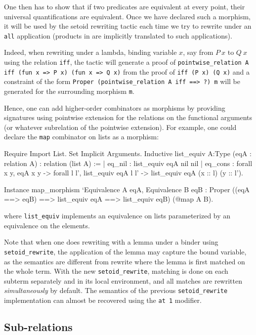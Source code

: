 One then has to show that if two predicates are equivalent at every
point, their universal quantifications are equivalent. Once we have
declared such a morphism, it will be used by the setoid rewriting tactic
each time we try to rewrite under an \texttt{all} application (products
in \Prop{} are implicitly translated to such applications).

Indeed, when rewriting under a lambda, binding variable $x$, say from
$P~x$ to $Q~x$ using the relation \texttt{iff}, the tactic will generate
a proof of \texttt{pointwise\_relation A iff (fun x => P x) (fun x => Q
x)} from the proof of \texttt{iff (P x) (Q x)} and a constraint of the
form \texttt{Proper (pointwise\_relation A iff ==> ?) m} will be
generated for the surrounding morphism \texttt{m}.

Hence, one can add higher-order combinators as morphisms by providing
signatures using pointwise extension for the relations on the functional
arguments (or whatever subrelation of the pointwise extension).
For example, one could declare the \texttt{map} combinator on lists as 
a morphism:
\begin{coq_eval}
Require Import List.
Set Implicit Arguments.
Inductive list_equiv {A:Type} (eqA : relation A) : relation (list A) :=
| eq_nil : list_equiv eqA nil nil
| eq_cons : forall x y, eqA x y -> 
  forall l l', list_equiv eqA l l' -> list_equiv eqA (x :: l) (y :: l').
\end{coq_eval}
\begin{coq_example*}
Instance map_morphism `{Equivalence A eqA, Equivalence B eqB} :
  Proper ((eqA ==> eqB) ==> list_equiv eqA ==> list_equiv eqB) 
     (@map A B).
\end{coq_example*}

where \texttt{list\_equiv} implements an equivalence on lists
parameterized by an equivalence on the elements.

Note that when one does rewriting with a lemma under a binder
using \texttt{setoid\_rewrite}, the application of the lemma may capture
the bound variable, as the semantics are different from rewrite where
the lemma is first matched on the whole term. With the new
\texttt{setoid\_rewrite}, matching is done on each subterm separately
and in its local environment, and all matches are rewritten
\emph{simultaneously} by default. The semantics of the previous
\texttt{setoid\_rewrite} implementation can almost be recovered using
the \texttt{at 1} modifier.

\subsection{Sub-relations}

